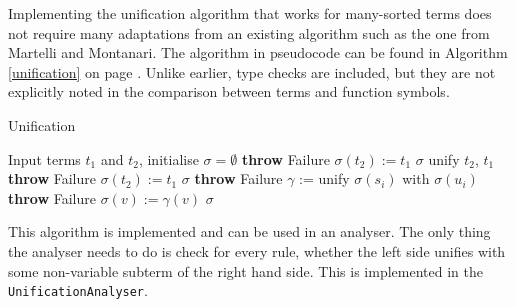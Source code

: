 Implementing the unification algorithm that works for many-sorted terms does not require many adaptations from an existing algorithm such as the one from Martelli and Montanari.\cite{Martelli:1982} The algorithm in pseudocode can be found in Algorithm \ref{unification} on page \pageref{unification}. Unlike earlier, type checks are included, but they are not explicitly noted in the comparison between terms and function symbols.  

\begin{algorithm}
\caption{Unification}
\label{unification}
\begin{algorithmic}[1]
\STATE Input terms $t_1$ and $t_2$, initialise $\sigma = \emptyset$
        \STATE \textbf{throw} Failure
      \ELSE
        \STATE $\sigma(t_2) := t_1$
      \ENDIF
    \ENDIF
    \RETURN $\sigma$
  \ELSE
    \RETURN unify $t_2$, $t_1$
  \ENDIF
{}
      \STATE \textbf{throw} Failure
    \ELSE 
      \STATE $\sigma(t_2) := t_1$
      \RETURN $\sigma$
    \ENDIF
      \STATE \textbf{throw} Failure
    \ENDIF
      \STATE $\gamma$ := unify $\sigma(s_i)$ with $\sigma(u_i)$
          \STATE \textbf{throw} Failure
        \ELSE
          \STATE $\sigma(v) := \gamma(v)$
        \ENDIF
      \ENDFOR
    \ENDFOR
    \RETURN $\sigma$
  \ENDIF
\ENDIF
\end{algorithmic}
\end{algorithm}

This algorithm is implemented and can be used in an analyser. The only thing the analyser needs to do is check for every rule, whether the left side unifies with some non-variable subterm of the right hand side. This is implemented in the \texttt{UnificationAnalyser}.